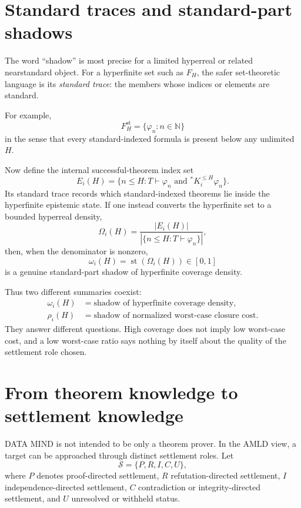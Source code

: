 \documentclass[11pt]{article}
\newcommand{\st}{\operatorname{st}}
\begin{document}
\section{Standard traces and standard-part shadows}

The word ``shadow'' is most precise for a limited hyperreal or related nearstandard object. For a hyperfinite set such as $F_H$, the safer set-theoretic language is its \emph{standard trace}: the members whose indices or elements are standard.

For example,
\begin{equation}
F_H^{\mathrm{st}}
=
\{\varphi_n:n\in\mathbb N\}
\end{equation}
in the sense that every standard-indexed formula is present below any unlimited $H$.

Now define the internal successful-theorem index set
\begin{equation}
E_i(H)=
\{n\le H:T\vdash\varphi_n\text{ and }{}^*K_i^{\le H}\varphi_n\}.
\end{equation}
Its standard trace records which standard-indexed theorems lie inside the hyperfinite epistemic state. If one instead converts the hyperfinite set to a bounded hyperreal density,
\begin{equation}
\Omega_i(H)=
\frac{|E_i(H)|}{|\{n\le H:T\vdash\varphi_n\}|},
\end{equation}
then, when the denominator is nonzero,
\begin{equation}
\omega_i(H)=\st(\Omega_i(H))\in[0,1]
\label{eq:shadowcoverage}
\end{equation}
is a genuine standard-part shadow of hyperfinite coverage density.

Thus two different summaries coexist:
\begin{align}
\omega_i(H)&=\text{shadow of hyperfinite coverage density},\\
\rho_i(H)&=\text{shadow of normalized worst-case closure cost}.
\end{align}
They answer different questions. High coverage does not imply low worst-case cost, and a low worst-case ratio says nothing by itself about the quality of the settlement role chosen.

\section{From theorem knowledge to settlement knowledge}

DATA MIND is not intended to be only a theorem prover. In the AMLD view, a target can be approached through distinct settlement roles. Let
\begin{equation}
\mathcal S=\{P,R,I,C,U\},
\end{equation}
where $P$ denotes proof-directed settlement, $R$ refutation-directed settlement, $I$ independence-directed settlement, $C$ contradiction or integrity-directed settlement, and $U$ unresolved or withheld status.
\end{document}
